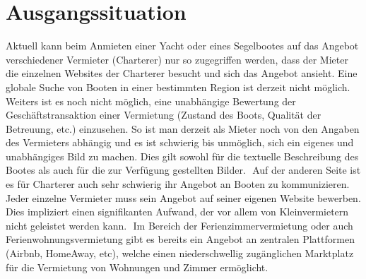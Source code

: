 \documentclass[12pt]{article}
\theoremstyle{definition}
\begin{document}
\section{Ausgangssituation}
Aktuell kann beim Anmieten einer Yacht oder eines Segelbootes auf das Angebot verschiedener Vermieter (Charterer) nur so zugegriffen werden, dass der Mieter die einzelnen Websites der Charterer besucht und sich das Angebot ansieht. Eine globale Suche von Booten in einer bestimmten Region ist derzeit nicht möglich.
​
Weiters ist es noch nicht möglich, eine unabhängige Bewertung der Geschäfts\-trans\-aktion einer Vermietung (Zustand des Boots, Qualität der Betreuung, etc.) einzusehen. So ist man derzeit als Mieter noch von den Angaben des Vermieters abhängig und es ist schwierig bis unmöglich, sich ein eigenes und unabhängiges Bild zu machen. Dies gilt sowohl für die textuelle Beschreibung des Bootes als auch für die zur Verfügung gestellten Bilder.
​
Auf der anderen Seite ist es für Charterer auch sehr schwierig ihr Angebot an Booten zu kommunizieren. Jeder einzelne Vermieter muss sein Angebot auf seiner eigenen Website bewerben. Dies impliziert einen signifikanten Aufwand, der vor allem von Kleinvermietern nicht geleistet werden kann.
​
Im Bereich der Ferienzimmervermietung oder auch Ferienwohnungsvermietung gibt es bereits ein Angebot an zentralen Plattformen (Airbnb, HomeAway, etc), welche einen niederschwellig zugänglichen Marktplatz für die Vermietung von Wohnungen und Zimmer ermöglicht.
​
\pagebreak
​
\end{document}
